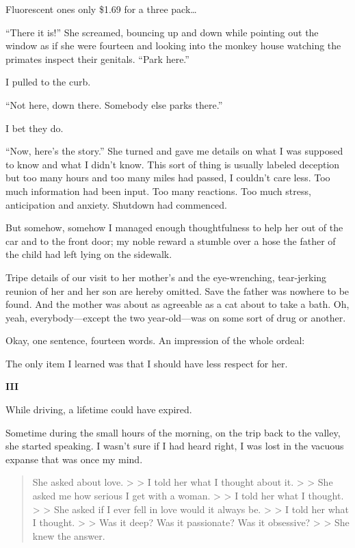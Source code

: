 \documentclass[
]{article}
\begin{document}
Fluorescent ones only \$1.69 for a three pack\ldots{}

``There it is!'' She screamed, bouncing up and down while pointing out
the window as if she were fourteen and looking into the monkey house
watching the primates inspect their genitals. ``Park here.''

I pulled to the curb.

``Not here, down there. Somebody else parks there.''

I bet they do.

``Now, here's the story.'' She turned and gave me details on what I was
supposed to know and what I didn't know. This sort of thing is usually
labeled deception but too many hours and too many miles had passed, I
couldn't care less. Too much information had been input. Too many
reactions. Too much stress, anticipation and anxiety. Shutdown had
commenced.

But somehow, somehow I managed enough thoughtfulness to help her out of
the car and to the front door; my noble reward a stumble over a hose the
father of the child had left lying on the sidewalk.

Tripe details of our visit to her mother's and the eye-wrenching,
tear-jerking reunion of her and her son are hereby omitted. Save the
father was nowhere to be found. And the mother was about as agreeable as
a cat about to take a bath. Oh, yeah, everybody---except the two
year-old---was on some sort of drug or another.

Okay, one sentence, fourteen words. An impression of the whole ordeal:

The only item I learned was that I should have less respect for her.

\textbf{III}

While driving, a lifetime could have expired.

Sometime during the small hours of the morning, on the trip back to the
valley, she started speaking. I wasn't sure if I had heard right, I was
lost in the vacuous expanse that was once my mind.

\begin{quote}
She asked about love. \textgreater{} \textgreater{} I told her what I
thought about it. \textgreater{} \textgreater{} She asked me how serious
I get with a woman. \textgreater{} \textgreater{} I told her what I
thought. \textgreater{} \textgreater{} She asked if I ever fell in love
would it always be. \textgreater{} \textgreater{} I told her what I
thought. \textgreater{} \textgreater{} Was it deep? Was it passionate?
Was it obsessive? \textgreater{} \textgreater{} She knew the answer.
\end{quote}
\end{document}

